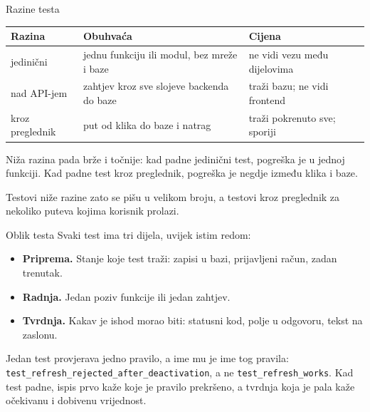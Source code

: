 \begin{frame}{Razine testa}
\vspace{0.3em}
\begin{center}
{\small
\setlength{\tabcolsep}{6pt}
\renewcommand{\arraystretch}{1.35}
\begin{tabular}{@{}L{2.6cm}L{4.3cm}L{4.4cm}@{}}
  \toprule
  \textbf{Razina} & \textbf{Obuhvaća} & \textbf{Cijena} \\
  \midrule
  jedinični & jednu funkciju ili modul, bez mreže i baze & ne vidi vezu među dijelovima \\
  nad API-jem & zahtjev kroz sve slojeve backenda do baze & traži bazu; ne vidi frontend \\
  kroz preglednik & put od klika do baze i natrag & traži pokrenuto sve; sporiji \\
  \bottomrule
\end{tabular}
}
\end{center}

\vspace{0.6em}
Niža razina pada brže i točnije: kad padne jedinični test, pogreška je u jednoj funkciji. Kad padne test kroz preglednik, pogreška je negdje između klika i baze.

\vspace{0.4em}
Testovi niže razine zato se pišu u velikom broju, a testovi kroz preglednik za nekoliko puteva kojima korisnik prolazi.
\end{frame}

\begin{frame}{Oblik testa}
Svaki test ima tri dijela, uvijek istim redom:

\vspace{0.6em}
\begin{itemize}
  \itemsep0.5em
  \item \textbf{Priprema.} Stanje koje test traži: zapisi u bazi, prijavljeni račun, zadan trenutak.
  \item \textbf{Radnja.} Jedan poziv funkcije ili jedan zahtjev.
  \item \textbf{Tvrdnja.} Kakav je ishod morao biti: statusni kod, polje u odgovoru, tekst na zaslonu.
\end{itemize}

\vspace{0.8em}
Jedan test provjerava jedno pravilo, a ime mu je ime tog pravila: \texttt{test\_refresh\_rejected\_after\_deactivation}, a ne \texttt{test\_refresh\_works}. Kad test padne, ispis prvo kaže koje je pravilo prekršeno, a tvrdnja koja je pala kaže očekivanu i dobivenu vrijednost.
\end{frame}

